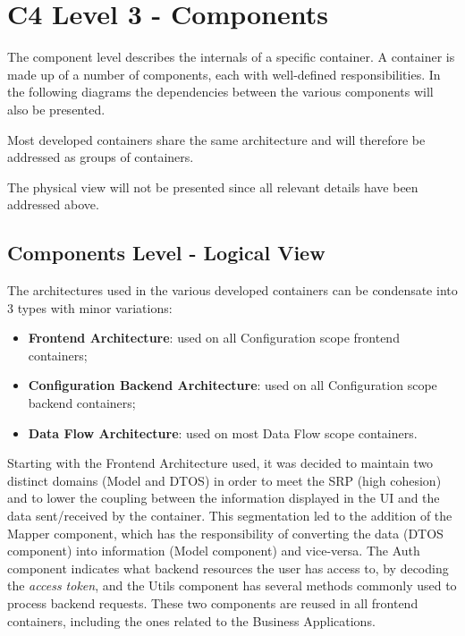 
\chapter{C4 Level 3 - Components}
\label{appendix:design:architecture:platform:components}

The component level describes the internals of a specific container. A container is made up of a number of components, each with well-defined responsibilities. In the following diagrams the dependencies between the various components will also be presented.

Most developed containers share the same architecture and will therefore be addressed as groups of containers.

The physical view will not be presented since all relevant details have been addressed above.

\section{Components Level - Logical View}
\label{par:design:architecture:platform:components:logical}

The architectures used in the various developed containers can be condensate into 3 types with minor variations:

\begin{itemize}
   \item \textbf{Frontend Architecture}: used on all Configuration scope frontend containers;
   \item \textbf{Configuration Backend Architecture}: used on all Configuration scope backend containers;
   \item \textbf{Data Flow Architecture}: used on most Data Flow scope containers.
\end{itemize}

Starting with the Frontend Architecture used, it was decided to maintain two distinct domains (Model and DTOS) in order to meet the \gls{SRP} (high cohesion) and to lower the coupling between the information displayed in the UI and the data sent/received by the container. This segmentation led to the addition of the Mapper component, which has the responsibility of converting the data (DTOS component) into information (Model component) and vice-versa. The Auth component indicates what backend resources the user has access to, by decoding the \textit{access token}, and the Utils component has several methods commonly used to process backend requests. These two components are reused in all frontend containers, including the ones related to the Business Applications.

